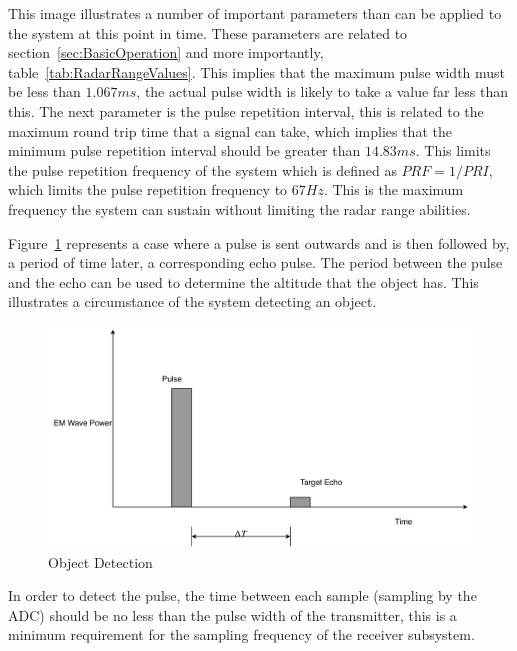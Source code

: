 \documentclass[11pt]{witseiepaper}
\begin{document}
This image illustrates a number of important parameters than can be applied to the system at this point in time. These parameters are related to section~\ref{sec:BasicOperation} and more importantly, table~\ref{tab:RadarRangeValues}. This implies that the maximum pulse width must be less than $1.067 ms$, the actual pulse width is likely to take a value far less than this. 
The next parameter is the pulse repetition interval, this is related to the maximum round trip time that a signal can take, which implies that the minimum pulse repetition interval should be greater than $14.83 ms$. This limits the pulse repetition frequency of the system which is defined as $PRF = 1/PRI$, which limits the pulse repetition frequency to $67 Hz$. This is the maximum frequency the system can sustain without limiting the radar range abilities.

Figure~\ref{fig:ObjectDetection} represents a case where a pulse is sent outwards and is then followed by, a period of time later, a corresponding echo pulse.
The period between the pulse and the echo can be used to determine the altitude that the object has. This illustrates a circumstance of the system detecting an object. 

\begin{center}
    \begin{figure}
        \includegraphics[width=\textwidth]{ObjectDetection.pdf}
        \caption{Object Detection}
        \label{fig:ObjectDetection}    
    \end{figure}
\end{center}
In order to detect the pulse, the time between each sample (sampling by the ADC) should be no less than the pulse width of the transmitter, this is a minimum requirement for the sampling frequency of the receiver subsystem.
\end{document}
